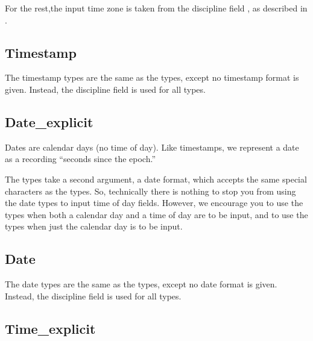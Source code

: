 For the rest,the input time zone is taken
from the \pads{} discipline field , as
described in .

\subsection{Timestamp}

\aedBegin{}
\aedEnd{}

The timestamp types are the same as the  types,
except no timestamp format is given.  Instead, the \pads{}
discipline field  is used
for all  types.

\subsection{Date\_explicit}

\aedBegin{}
\aedEnd{}

Dates are calendar days (no time of day).  Like timestamps, we
represent a date as a  recording ``seconds since the epoch.''

The  types take a second argument, a date format,
which accepts the same special characters as the  types.
So, technically there is nothing to stop you from using the date types
to input time of day fields.  However, we encourage you to use the
 types when both a calendar day and a time of day are to be
input, and to use the  types when just the calendar day is to be
input.

\subsection{Date}

\aedBegin{}
\aedEnd{}

The date types are the same as the  types,
except no date format is given.  Instead, the \pads{}
discipline field  is used
for all  types.

\subsection{Time\_explicit}

